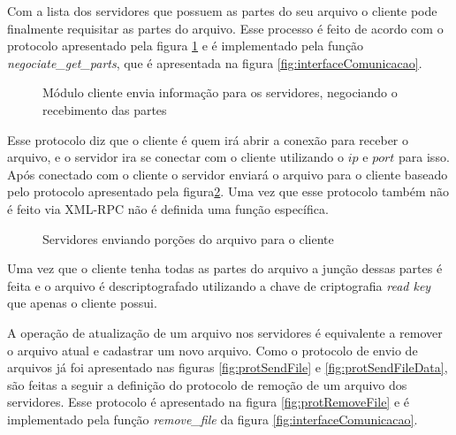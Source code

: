         Com a lista dos servidores que possuem as partes do seu arquivo o cliente pode finalmente requisitar as partes do arquivo. Esse processo é feito de acordo com o protocolo apresentado pela figura \ref{fig:protNegociateGetPart} e é implementado pela função \textit{negociate\_get\_parts}, que é apresentada na figura \ref{fig:interfaceComunicacao}.
        
        \begin{figure}[!ht]
        \caption{Módulo cliente envia informação para os servidores, negociando o recebimento das partes}
        \label{fig:protNegociateGetPart}
        \end{figure}
        
        Esse protocolo diz que o cliente é quem irá abrir a conexão para receber o arquivo, e o servidor ira se conectar com o cliente utilizando o $ip$ e $port$ para isso. Após conectado com o cliente o servidor enviará o arquivo para o cliente baseado pelo protocolo apresentado pela figura\ref{fig:protGetPart}. Uma vez que esse protocolo também não é feito via XML-RPC não é definida uma função específica.
        
        \begin{figure}[!ht]
        \caption{Servidores enviando porções do arquivo para o cliente}
        \label{fig:protGetPart}
        \end{figure}
        
        
        
        Uma vez que o cliente tenha todas as partes do arquivo a junção dessas partes é feita e o arquivo é descriptografado utilizando a chave de criptografia \textit{read key} que apenas o cliente possui.
        
        A operação de atualização de um arquivo nos servidores é equivalente a remover o arquivo atual e cadastrar um novo arquivo. Como o protocolo de envio de arquivos já foi apresentado nas figuras \ref{fig:protSendFile} e \ref{fig:protSendFileData}, são feitas a seguir a definição do protocolo de remoção de um arquivo dos servidores. Esse protocolo é apresentado na figura \ref{fig:protRemoveFile} e é implementado pela função \textit{remove\_file} da figura \ref{fig:interfaceComunicacao}.
        
